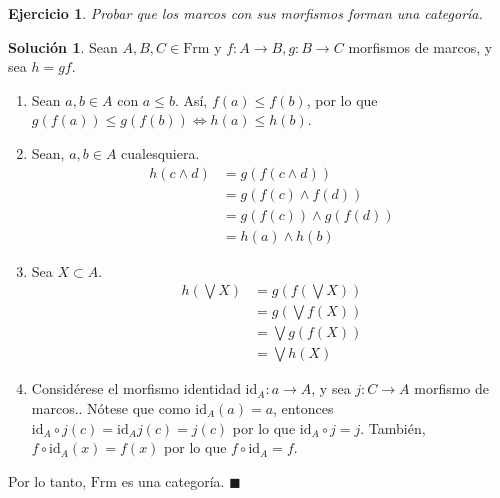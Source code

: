 \documentclass[12pt,letterpaper,titlepage]{article}
\newcommand{\xqed}[1]{%
  \leavevmode\unskip\penalty9999 \hbox{}\nobreak\hfill
  \quad\hbox{\ensuremath{#1}}}
\newtheorem{exe}{Ejercicio}
\theoremstyle{definition}
\newtheorem*{soltemp}{Solución}
\newenvironment{sol}[1]{%
    \begin{soltemp}#1}{%
    \xqed{\blacksquare}\end{soltemp}%
}
\newcommand\Sup{\bigvee}
\renewcommand\inf{\wedge}
\newcommand\<{\langle}
\renewcommand\>{\rangle}
\newcommand{\Frm}{\mathrm{Frm}}
\newcommand{\id}{\mathrm{id}}
\begin{document}
\begin{exe}%
  Probar que los marcos con sus morfismos forman una categoría.
\end{exe}
\begin{sol}
    Sean $A,B,C\in \Frm$ y $f:A\to B, g:B\to C$ morfismos de marcos, y sea $h=gf$.
    \begin{enumerate}
        \item Sean $a,b\in A$ con $a\leq b$. Así, $f(a)\leq f(b)$, por lo que $g(f(a))\leq g(f(b)) \iff h(a)\leq h(b)$. 
        \item Sean, $a,b\in A$ cualesquiera. 
        \begin{align*}
        h(c\inf d)&=g(f(c\inf d))\\
        &=g(f(c)\inf f(d))\\
        &=g(f(c))\inf g(f(d))\\
        &=h(a)\inf h(b)
        \end{align*}
        \item Sea $X\subset A$. 
        \begin{align*}
            h(\Sup X)&=g(f(\Sup X))\\
            &=g(\Sup f(X))\\
            &=\Sup g(f(X))\\
            &=\Sup h(X)
        \end{align*}
        \item Considérese el morfismo identidad $\id_A:a\to A$, y sea $j:C\to A$ morfismo de marcos.. Nótese que como $\id_A(a)=a$, entonces $\id_A\circ j(c)=\id_Aj(c)=j(c)$ por lo que $\id_A\circ j=j$. También, $f\circ \id_A(x)=f(x)$ por lo que $f\circ \id_A=f$.
    \end{enumerate}
    Por lo tanto, $\Frm$ es una categoría.
\end{sol}
\end{document}
